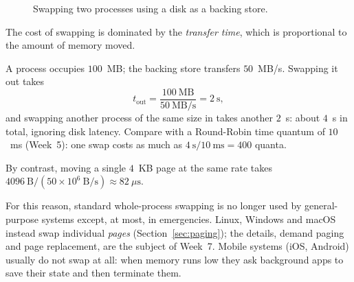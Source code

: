 \documentclass[11pt,a4paper]{article}
\begin{document}
\begin{figure}[H]
\centering
{}
\caption{Swapping two processes using a disk as a backing store.}
\end{figure}

The cost of swapping is dominated by the \emph{transfer time}, which is proportional to the amount of memory moved.

\begin{example}
A process occupies $100$~MB; the backing store transfers $50$~MB/s. Swapping it out takes
\[
t_{\text{out}} = \frac{100\ \text{MB}}{50\ \text{MB/s}} = 2\ \text{s},
\]
and swapping another process of the same size in takes another $2$~s: about $4$~s in total, ignoring disk latency. Compare with a Round-Robin time quantum of $10$~ms (Week~5): one swap costs as much as $4\ \text{s} / 10\ \text{ms} = 400$ quanta.

By contrast, moving a single $4$~KB page at the same rate takes $4096\ \text{B} / (50\times10^{6}\ \text{B/s}) \approx 82\ \mu\text{s}$.
\end{example}

For this reason, standard whole-process swapping is no longer used by general-purpose systems except, at most, in emergencies. Linux, Windows and macOS instead swap individual \emph{pages} (Section~\ref{sec:paging}); the details, demand paging and page replacement, are the subject of Week~7. Mobile systems (iOS, Android) usually do not swap at all: when memory runs low they ask background apps to save their state and then terminate them.
\end{document}
